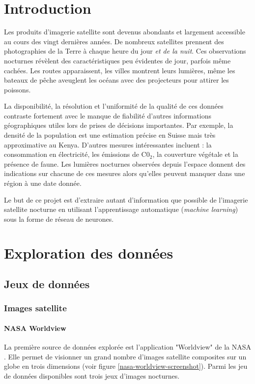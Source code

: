 \documentclass[a4paper]{report}
\begin{document}
\chapter{Introduction}
Les produits d'imagerie satellite sont devenus abondants et largement accessible au cours des vingt dernières années. De nombreux satellites prennent des photographies de la Terre à chaque heure du jour \textit{et de la nuit}. Ces observations nocturnes révèlent des caractéristiques peu évidentes de jour, parfois même cachées. Les routes apparaissent, les villes montrent leurs lumières, même les bateaux de pêche aveuglent les océans avec des projecteurs pour attirer les poissons.

La disponibilité, la résolution et l'uniformité de la qualité de ces données contraste fortement avec le manque de fiabilité d'autres informations géographiques utiles lors de prises de décisions importantes. Par exemple, la densité de la population est une estimation précise en Suisse mais très approximative au Kenya. D'autres mesures intéressantes incluent : la consommation en électricité, les émissions de C0$_2$, la couverture végétale et la présence de faune. Les lumières nocturnes observées depuis l'espace donnent des indications sur chacune de ces mesures alors qu'elles peuvent manquer dans une région à une date donnée.

Le but de ce projet est d'extraire autant d'information que possible de l'imagerie satellite nocturne en utilisant l'apprentissage automatique (\textit{machine learning}) sous la forme de réseau de neurones.

\chapter{Exploration des données}
\section{Jeux de données}
\subsection{Images satellite}
\subsubsection{NASA Worldview}
La première source de données explorée est l'application "Worldview" de la NASA \cite{nasa-worldview}. Elle permet de visionner un grand nombre d'images satellite composites sur un globe en trois dimensions (voir figure \ref{nasa-worldview-screenshot}). Parmi les jeu de données disponibles sont trois jeux d'images nocturnes.
\end{document}
